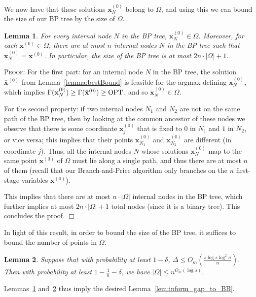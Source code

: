 \documentclass{article}
\newcommand{\xv}[0]{\mathbf{x}}
\newtheorem{lemma}{Lemma}[section]
\newenvironment{proof}[1][]
   {\textsc{Proof#1: }}
   {\hfill$\Box$\smallskip}
\newcommand{\OPT}{\textup{OPT}}
\begin{document}
We now have that these solutions $\xv^{(0)}_N$ belong to $\Omega$, and using this we can bound the size of our BP tree by the size of $\Omega$.

\begin{lemma} \label{lemma:mappingOmega}
    For every internal node $N$ in the BP tree, $\xv_N^{(0)} \in \Omega$. Moreover, for each $\xv^{(0)} \in \Omega$, there are at most $n$ internal nodes $N$ in the BP tree such that $\xv_N^{(0)} = \xv^{(0)}$. In particular, the size of the BP tree is at most $2n \cdot |\Omega| + 1$.
\end{lemma}

\begin{proof}
For the first part: for an internal node $N$ in the BP tree, the solution $\bar{\xv}^{(0)}$ from Lemma~\ref{lemma:bestBound} is feasible for the argmax defining $\xv_N^{(0)}$, which implies $\Gamma(\xv_N^{(0)}) \ge \Gamma(\bar{\xv}^{(0)}) \ge \OPT$, and so $\xv_N^{(0)} \in \Omega$.

For the second property: if two internal nodes $N_1$ and $N_2$ are not on the same path of the BP tree, then by looking at the common ancestor of these nodes we observe that there is some coordinate $\xv^{(0)}_j$ that is fixed to $0$ in $N_1$ and $1$ in $N_2$, or vice versa; this implies that their points $\xv_{N_1}^{(0)}$ and $\xv_{N_2}^{(0)}$ are different (in coordinate $j$). Thus, all the internal nodes $N$ whose solutions $\xv_{N}^{(0)}$ map to the same point $\xv^{(0)}$ of $\Omega$ must lie along a single path, and thus there are at most $n$ of them (recall that our Branch-and-Price algorithm only branches on the $n$ first-stage variables $\xv^{(0)}$).

This implies that there are at most $n \cdot |\Omega|$ internal nodes in the BP tree, which further implies at most $2n \cdot |\Omega| + 1$ total nodes (since it is a binary tree). This concludes the proof.
\end{proof}

In light of this result, in order to bound the size of the BP tree, it suffices to bound the number of points in $\Omega$.

\begin{lemma} \label{lemma:omega}
    Suppose that with probability at least $1 - \delta$, $\Delta \le O_m(\frac{s \log s \log^2 n}{n})$. Then with probability at least $1 - \frac{1}{n} - \delta$, we have $|\Omega| \le n^{O_m(\log s)}$.
\end{lemma}

Lemmas~\ref{lemma:mappingOmega} and~\ref{lemma:omega} thus imply the desired Lemma~\ref{lem:inform_gap_to_BB}.
\end{document}
